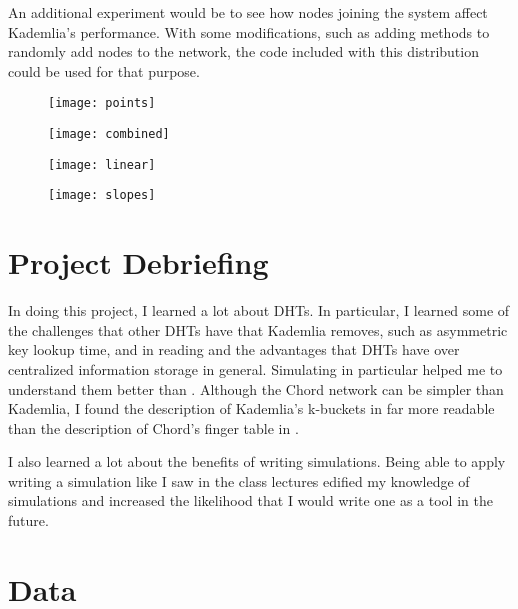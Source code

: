 \documentclass[notitlepage,12pt]{article}
\begin{document}
An additional experiment would be to see how nodes joining the system affect
Kademlia's performance. With some modifications, such as adding methods to
randomly add nodes to the network, the code included with this distribution
could be used for that purpose. 

\begin{figure}[htdp]
  \centering
  \caption{}
  \texttt{[image: points]}
  \label{fig:points}
\end{figure}

\begin{figure}[htdp]
  \centering
  \caption{}
  \texttt{[image: combined]}
  \label{fig:combined}
\end{figure}

\begin{figure}[htdp]
  \centering
  \caption{}
  \texttt{[image: linear]}
  \label{fig:linear}
\end{figure}

\begin{figure}[htdp]
  \centering
  \caption{}
  \texttt{[image: slopes]}
  \label{fig:slopes}
\end{figure}

\section{Project Debriefing}
\label{sec:debrief}

In doing this project, I learned a lot about DHTs. In particular, I learned some
of the challenges that other DHTs have that Kademlia removes, such as asymmetric
key lookup time, and in reading \cite{i2p} and \cite{kademlia} the advantages
that DHTs have over centralized information storage in general. Simulating
\cite{kademlia} in particular helped me to understand them better than
\cite{chord}. Although the Chord network can be simpler than Kademlia, I found
the description of Kademlia's k-buckets in \cite{kademlia} far more readable than
the description of Chord's finger table in \cite{chord}. 

I also learned a lot about the benefits of writing simulations. Being able to
apply writing a simulation like I saw in the class lectures edified my knowledge
of simulations and increased the likelihood that I would write one as a tool in
the future. 

\section{Data}
\label{sec:data}
\end{document}
